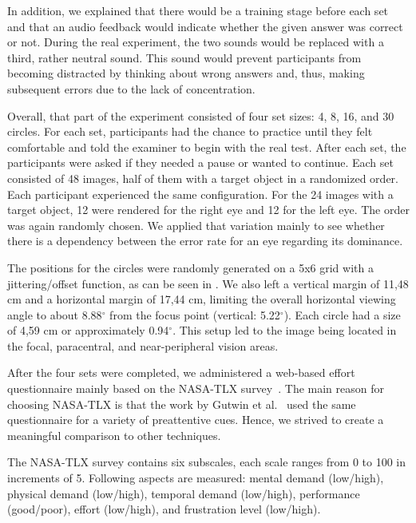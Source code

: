 \documentclass[journal]{vgtc}                %
\begin{document}
In addition, we explained that there would be a training stage before each set and that an audio feedback would indicate whether the given answer was correct or not. During the real experiment, the two sounds would be replaced with a third, rather neutral sound. This sound would prevent participants from becoming distracted by thinking about wrong answers and, thus, making subsequent errors due to the lack of concentration. 

Overall, that part of the experiment consisted of four set sizes: 4, 8, 16, and 30 circles. For each set, participants had the chance to practice until they felt comfortable and told the examiner to begin with the real test. After each set, the participants were asked if they needed a pause or wanted to continue. Each set consisted of 48 images, half of them with a target object in a randomized order. Each participant experienced the same configuration. For the 24 images with a target object, 12 were rendered for the right eye and 12 for the left eye. The order was again randomly chosen. We applied that variation mainly to see whether there is a dependency between the error rate for an eye regarding its dominance.



The positions for the circles were randomly generated on a 5x6 grid with a jittering/offset function, as can be seen in . We also left a vertical margin of 11,48 cm and a horizontal margin of 17,44 cm, limiting the overall horizontal viewing angle to about 8.88$^{\circ}$ from the focus point (vertical: 5.22$^{\circ}$). Each circle had a size of 4,59 cm or approximately 0.94$^{\circ}$. This setup led to the image being located in the focal, paracentral, and near-peripheral vision areas.




After the four sets were completed, we administered a web-based effort questionnaire mainly based on the NASA-TLX survey~\cite{hart1988development}. The main reason for choosing NASA-TLX is that the work by Gutwin et al.~\cite{Gutwin:2017:PPI:3025453.3025984} used the same questionnaire for a variety of preattentive cues. Hence, we strived to create a meaningful comparison to other techniques.

The NASA-TLX survey contains six subscales, each scale ranges from 0 to 100 in increments of 5. Following aspects are measured: mental demand (low/high), physical demand (low/high), temporal demand (low/high), performance (good/poor), effort (low/high), and frustration level (low/high). 
\end{document}
